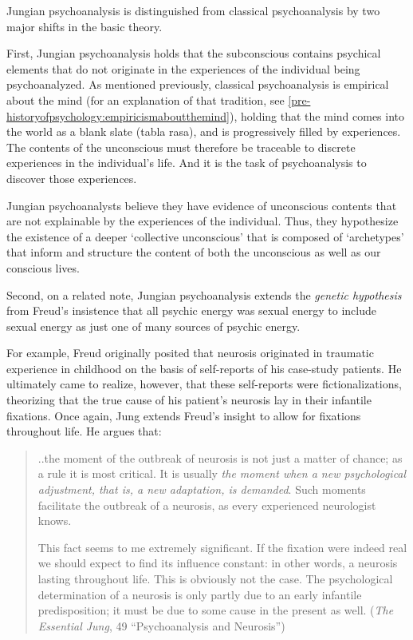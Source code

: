 \begin{refsection}
Jungian psychoanalysis is distinguished from classical psychoanalysis by two major shifts in the basic theory.

First, Jungian psychoanalysis holds that the subconscious contains psychical elements that do not originate in the experiences of the individual being psychoanalyzed. As mentioned previously, classical psychoanalysis is empirical about the mind (for an explanation of that tradition, see \ref{pre-historyofpsychology:empiricismaboutthemind}), holding that the mind comes into the world as a blank slate (tabla rasa), and is progressively filled by experiences. The contents of the unconscious must therefore be traceable to discrete experiences in the individual's life. And it is the task of psychoanalysis to discover those experiences. 

Jungian psychoanalysts believe they have evidence of unconscious contents that are not explainable by the experiences of the individual. Thus, they hypothesize the existence of a deeper `collective unconscious' that is composed of `archetypes' that inform and structure the content of both the unconscious as well as our conscious lives.

Second, on a related note, Jungian psychoanalysis extends the \emph{genetic hypothesis} from Freud's insistence that all psychic energy was sexual energy to include sexual energy as just one of many sources of psychic energy.

For example, Freud originally posited that neurosis originated in traumatic experience in childhood on the basis of self-reports of his case-study patients. He ultimately came to realize, however, that these self-reports were fictionalizations, theorizing that the true cause of his patient's neurosis lay in their infantile fixations. Once again, Jung extends Freud's insight to allow for fixations throughout life. He argues that:

\begin{quote}

..the moment of the outbreak of neurosis is not just a matter of chance; as a rule it is most critical. It is usually \emph{the moment when a new psychological adjustment, that is, a new adaptation, is demanded}. Such moments facilitate the outbreak of a neurosis, as every experienced neurologist knows.

This fact seems to me extremely significant. If the fixation were indeed real we should expect to find its influence constant: in other words, a neurosis lasting throughout life. This is obviously not the case. The psychological determination of a neurosis is only partly due to an early infantile predisposition; it must be due to some cause in the present as well. (\emph{The Essential Jung}, 49 ``Psychoanalysis and Neurosis'')
\end{quote}


\end{refsection}
